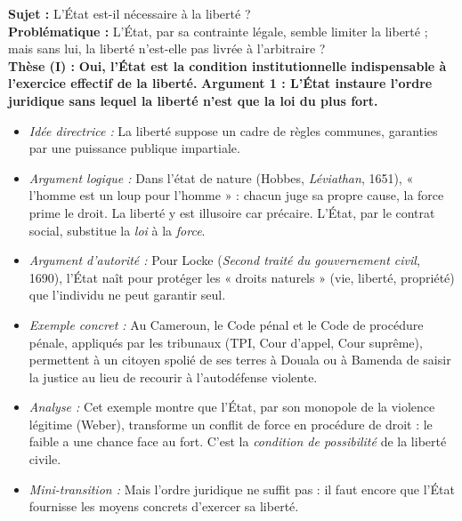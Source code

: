 \documentclass[11pt]{article}
\begin{document}
\begin{exoresolu}
\textbf{Sujet :} L'État est-il nécessaire à la liberté ? \\
\textbf{Problématique :} L'État, par sa contrainte légale, semble limiter la liberté ; mais sans lui, la liberté n'est-elle pas livrée à l'arbitraire ? \\
\textbf{Thèse (I) :} \textbf{Oui, l'État est la condition institutionnelle indispensable à l'exercice effectif de la liberté.}
\tcblower
\textbf{Argument 1 : L'État instaure l'ordre juridique sans lequel la liberté n'est que la loi du plus fort.}
\begin{itemize}
    \item \textit{Idée directrice :} La liberté suppose un cadre de règles communes, garanties par une puissance publique impartiale.
    \item \textit{Argument logique :} Dans l'état de nature (Hobbes, \emph{Léviathan}, 1651), « l'homme est un loup pour l'homme » : chacun juge sa propre cause, la force prime le droit. La liberté y est illusoire car précaire. L'État, par le contrat social, substitue la \emph{loi} à la \emph{force}.
    \item \textit{Argument d'autorité :} Pour Locke (\emph{Second traité du gouvernement civil}, 1690), l'État naît pour protéger les « droits naturels » (vie, liberté, propriété) que l'individu ne peut garantir seul.
    \item \textit{Exemple concret :} Au Cameroun, le Code pénal et le Code de procédure pénale, appliqués par les tribunaux (TPI, Cour d'appel, Cour suprême), permettent à un citoyen spolié de ses terres à Douala ou à Bamenda de saisir la justice au lieu de recourir à l'autodéfense violente.
    \item \textit{Analyse :} Cet exemple montre que l'État, par son monopole de la violence légitime (Weber), transforme un conflit de force en procédure de droit : le faible a une chance face au fort. C'est la \emph{condition de possibilité} de la liberté civile.
    \item \textit{Mini-transition :} Mais l'ordre juridique ne suffit pas : il faut encore que l'État fournisse les moyens concrets d'exercer sa liberté.
\end{itemize}


\end{exoresolu}
\end{document}
